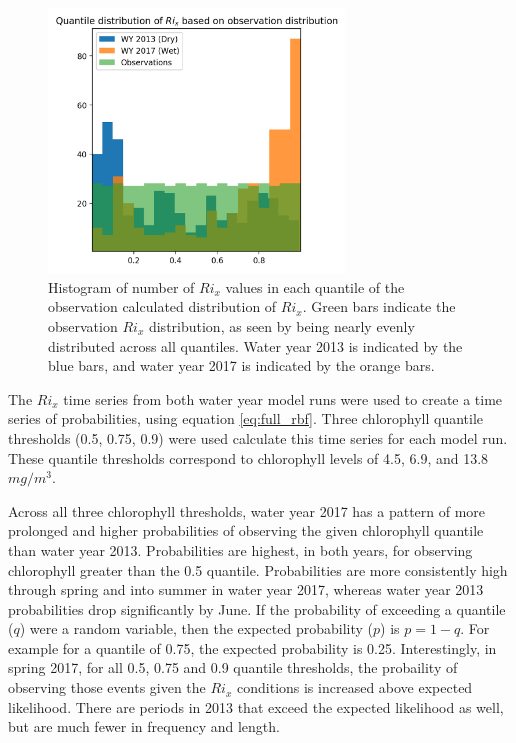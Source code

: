\documentclass[preprint,review,12pt]{elsarticle}
\begin{document}
\begin{figure}[ht!]
\centering
\includegraphics[width=0.7\textwidth]{Figures/quantile_rix_dist.png}
\caption{Histogram of number of \(Ri_x\) values in each quantile of the observation calculated distribution of \(Ri_x\). Green bars indicate the observation \(Ri_x\) distribution, as seen by being nearly evenly distributed across all quantiles. Water year 2013 is indicated by the blue bars, and water year 2017 is indicated by the orange bars.}
\label{fig:quant_hist}
\end{figure}
\FloatBarrier

The \(Ri_x\) time series from both water year model runs were used to create a time series of probabilities, using equation \ref{eq:full_rbf}. Three chlorophyll quantile thresholds (0.5, 0.75, 0.9) were used calculate this time series for each model run. These quantile thresholds correspond to chlorophyll levels of 4.5, 6.9, and 13.8 \(mg/m^3\). 

Across all three chlorophyll thresholds, water year 2017 has a pattern of more prolonged and higher probabilities of observing the given chlorophyll quantile than water year 2013. Probabilities are highest, in both years, for observing chlorophyll greater than the 0.5 quantile. Probabilities are more consistently high through spring and into summer in water year 2017, whereas water year 2013 probabilities drop significantly by June. If the probability of exceeding a quantile (\(q\)) were a random variable, then the expected probability (\(p\)) is \(p=1-q\). For example for a quantile of 0.75, the expected probability is 0.25. Interestingly, in spring 2017, for all 0.5, 0.75 and 0.9 quantile thresholds, the probaility of observing those events given the \(Ri_x\) conditions is increased above expected likelihood. There are periods in 2013 that exceed the expected likelihood as well, but are much fewer in frequency and length.
\end{document}
